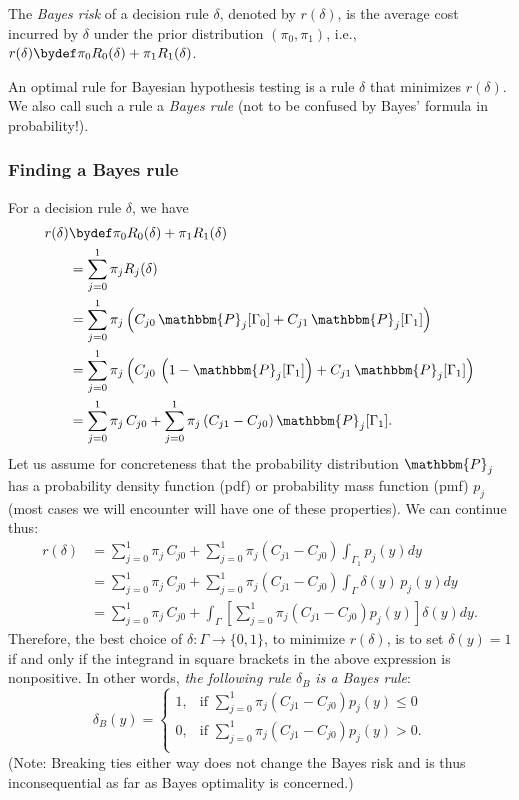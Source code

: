 \documentclass[12pt]{report}
\begin{document}
\begin{defn}
The {\em Bayes risk} of a decision rule $\delta$, denoted by $r(\delta)$, is the average cost incurred by $\delta$ under the prior distribution $(\pi_0, \pi_1)$, i.e., $r(\delta) \bydef \pi_0 R_0(\delta) + \pi_1 R_1(\delta)$.
\end{defn}

\begin{defn}
An optimal rule for Bayesian hypothesis testing is a rule $\delta$ that minimizes $r(\delta)$. We also call such a rule a {\em Bayes rule} (not to be confused by Bayes' formula in probability!). 
\end{defn}

\subsubsection{Finding a Bayes rule}

For a decision rule $\delta$, we have
\begin{align*}
r(\delta) &\bydef \pi_0 R_0(\delta) + \pi_1 R_1(\delta) \\
&= \sum_{j=0}^1 \pi_j R_j(\delta) \\
&= \sum_{j=0}^1 \pi_j \left( C_{j0} \, \mathbbm{P}_j[\Gamma_0] + C_{j1} \, \mathbbm{P}_j[\Gamma_1] \right) \\
&= \sum_{j=0}^1 \pi_j \left( C_{j0} \, \left(1 -  \mathbbm{P}_j[\Gamma_1] \right) + C_{j1} \, \mathbbm{P}_j[\Gamma_1] \right) \\
&= \sum_{j=0}^1  \pi_j \, C_{j0}  + \sum_{j=0}^1 \pi_j \left( C_{j1} - C_{j0} \right) \mathbbm{P}_j[\Gamma_1]. 
\end{align*}
Let us assume for concreteness that the probability distribution $\mathbbm{P}_j$ has a probability density function (pdf) or probability mass function (pmf) $p_j$ (most cases we will encounter will have one of these properties). We can continue thus: 
\begin{align*}
r(\delta) &= \sum_{j=0}^1  \pi_j \, C_{j0}  + \sum_{j=0}^1 \pi_j \left( C_{j1} - C_{j0} \right) \int_{\Gamma_1}p_j(y) dy \\
&= \sum_{j=0}^1  \pi_j \, C_{j0}  + \sum_{j=0}^1 \pi_j \left( C_{j1} - C_{j0} \right) \int_{\Gamma} \delta(y) \, p_j(y) dy \\
&= \sum_{j=0}^1  \pi_j \, C_{j0}  + \int_{\Gamma} \left[ \sum_{j=0}^1 \pi_j \left( C_{j1} - C_{j0} \right) p_j (y) \right]  \delta(y) dy.
\end{align*}
Therefore, the best choice of $\delta: \Gamma \to \{0,1\}$, to minimize $r(\delta)$, is to set $\delta(y) = 1$ if and only if the integrand in square brackets in the above expression is nonpositive. In other words, {\em the following rule $\delta_B$ is a Bayes rule}:
\[ \delta_B(y) = \left\{ 
\begin{array}{cc}
1, &  \text{if }\sum_{j=0}^1 \pi_j \left( C_{j1} - C_{j0} \right) p_j (y) \leq 0 \\
0, &  \text{if }\sum_{j=0}^1 \pi_j \left( C_{j1} - C_{j0} \right) p_j (y) > 0. \\
\end{array}
 \right. \]
 (Note: Breaking ties either way does not change the Bayes risk and is thus inconsequential as far as Bayes optimality is concerned.)




\end{document}
